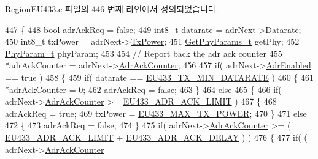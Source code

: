 Region\+E\+U433.\+c 파일의 446 번째 라인에서 정의되었습니다.


\begin{DoxyCode}
447 \{
448     \textcolor{keywordtype}{bool} adrAckReq = \textcolor{keyword}{false};
449     int8\_t datarate = adrNext->\mbox{\hyperlink{structs_adr_next_params_ae2f6080f3aa0e9485c55513ca56bb24d}{Datarate}};
450     int8\_t txPower = adrNext->\mbox{\hyperlink{structs_adr_next_params_a037b4f849fa8ed4aa1d3c58aef2b28ec}{TxPower}};
451     \mbox{\hyperlink{structs_get_phy_params}{GetPhyParams\_t}} getPhy;
452     \mbox{\hyperlink{unionu_phy_param}{PhyParam\_t}} phyParam;
453 
454     \textcolor{comment}{// Report back the adr ack counter}
455     *adrAckCounter = adrNext->\mbox{\hyperlink{structs_adr_next_params_a24f0356a3491bf07be9ac99ffa33896a}{AdrAckCounter}};
456 
457     \textcolor{keywordflow}{if}( adrNext->\mbox{\hyperlink{structs_adr_next_params_ab3e2fb44577c95786e11aacd56769703}{AdrEnabled}} == \textcolor{keyword}{true} )
458     \{
459         \textcolor{keywordflow}{if}( datarate == \mbox{\hyperlink{group___r_e_g_i_o_n_e_u433_ga800fe5b0107ad06f0938c226022b436b}{EU433\_TX\_MIN\_DATARATE}} )
460         \{
461             *adrAckCounter = 0;
462             adrAckReq = \textcolor{keyword}{false};
463         \}
464         \textcolor{keywordflow}{else}
465         \{
466             \textcolor{keywordflow}{if}( adrNext->\mbox{\hyperlink{structs_adr_next_params_a24f0356a3491bf07be9ac99ffa33896a}{AdrAckCounter}} >= \mbox{\hyperlink{group___r_e_g_i_o_n_e_u433_ga3e1ccf1b708f6851ff62811ee58bb37e}{EU433\_ADR\_ACK\_LIMIT}} )
467             \{
468                 adrAckReq = \textcolor{keyword}{true};
469                 txPower = \mbox{\hyperlink{group___r_e_g_i_o_n_e_u433_gaac93ce9446f1e4b5c3c09c9b2ebf2297}{EU433\_MAX\_TX\_POWER}};
470             \}
471             \textcolor{keywordflow}{else}
472             \{
473                 adrAckReq = \textcolor{keyword}{false};
474             \}
475             \textcolor{keywordflow}{if}( adrNext->\mbox{\hyperlink{structs_adr_next_params_a24f0356a3491bf07be9ac99ffa33896a}{AdrAckCounter}} >= ( \mbox{\hyperlink{group___r_e_g_i_o_n_e_u433_ga3e1ccf1b708f6851ff62811ee58bb37e}{EU433\_ADR\_ACK\_LIMIT}} + 
      \mbox{\hyperlink{group___r_e_g_i_o_n_e_u433_ga197b292bfc46b531e2d42a9e24f2fa0b}{EU433\_ADR\_ACK\_DELAY}} ) )
476             \{
477                 \textcolor{keywordflow}{if}( ( adrNext->\mbox{\hyperlink{structs_adr_next_params_a24f0356a3491bf07be9ac99ffa33896a}{AdrAckCounter}} %

\end{DoxyCode}
